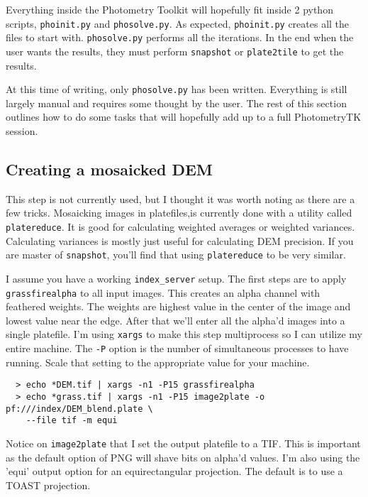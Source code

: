 Everything inside the Photometry Toolkit will hopefully fit
inside 2 python scripts, \texttt{phoinit.py} and
\texttt{phosolve.py}. As expected, \texttt{phoinit.py} creates all the
files to start with. \texttt{phosolve.py} performs all the
iterations. In the end when the user wants the results, they must
perform \texttt{snapshot} or \texttt{plate2tile} to get the results.

At this time of writing, only \texttt{phosolve.py} has been
written. Everything is still largely manual and requires some thought
by the user. The rest of this section outlines how to do some tasks
that will hopefully add up to a full PhotometryTK session.

\subsection{Creating a mosaicked DEM}

This step is not currently used, but I thought it was worth noting as
there are a few tricks. Mosaicking images in platefiles,is currently
done with a utility called \texttt{platereduce}. It is good for
calculating weighted averages or weighted variances. Calculating
variances is mostly just useful for calculating DEM precision. If you
are master of \texttt{snapshot}, you'll find that using
\texttt{platereduce} to be very similar.

I assume you have a working \texttt{index\_server} setup. The first
steps are to apply \texttt{grassfirealpha} to all input images. This
creates an alpha channel with feathered weights. The weights are
highest value in the center of the image and lowest value near the
edge. After that we'll enter all the alpha'd images into a single
platefile. I'm using \texttt{xargs} to make this step multiprocess so
I can utilize my entire machine. The \texttt{-P} option is the number
of simultaneous processes to have running. Scale that setting to the
appropriate value for your machine.

\begin{verbatim}
  > echo *DEM.tif | xargs -n1 -P15 grassfirealpha
  > echo *grass.tif | xargs -n1 -P15 image2plate -o pf:///index/DEM_blend.plate \
    --file tif -m equi
\end{verbatim}

Notice on \texttt{image2plate} that I set the output platefile to a
TIF. This is important as the default option of PNG will shave bits on
alpha'd values. I'm also using the 'equi' output option for an
equirectangular projection. The default is to use a TOAST projection.

